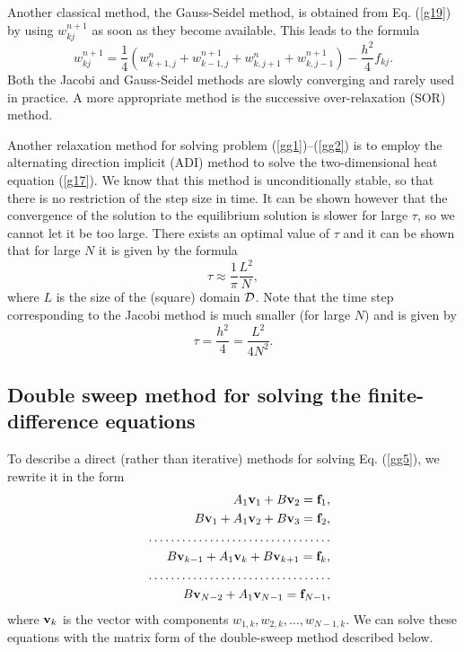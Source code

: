 Another classical method, the Gauss-Seidel method, is obtained from Eq. (\ref{g19})
by using $w_{kj}^{n+1}$ as soon as they become available. This leads to the formula
\begin{equation}
w_{kj}^{n+1}=\frac{1}{4}\left(w^{n}_{k+1,j}+w^{n+1}_{k-1,j}+w^{n}_{k,j+1}+w^{n+1}_{k,j-1}\right)
-\frac{h^2}{4}f_{kj}. \label{g20}
\end{equation}
Both the Jacobi and Gauss-Seidel methods are slowly converging and rarely used in practice.
A more appropriate method is the successive over-relaxation (SOR) method.

Another relaxation method for solving problem (\ref{gg1})--(\ref{gg2}) is to employ the alternating direction
implicit (ADI) method to solve the two-dimensional heat equation (\ref{g17}).
We know that this method is unconditionally stable, so that
there is no restriction of the step size in time. It can be shown however that the convergence of the
solution to the equilibrium solution is slower for large $\tau$, so we cannot let it be too large.
There exists an optimal value of $\tau$ and it can be shown that for large $N$ it is given by the formula
\[
\tau\approx\frac{1}{\pi}\frac{L^2}{N},
\]
where $L$ is the size of the (square) domain ${\cal D}$. Note that the time step corresponding
to the Jacobi method is much smaller (for large $N$) and is given by
\[
\tau=\frac{h^2}{4}=\frac{L^2}{4N^2}.
\]


\subsection{Double sweep method for solving the finite-difference equations}
To describe a direct (rather than iterative) methods for solving Eq. (\ref{gg5}), we rewrite
it in the form
\begin{eqnarray}
&&A_{1}{\bf v}_{1}+B{\bf v}_{2}={\bf f}_{1}, \nonumber \\
&&B{\bf v}_{1}+A_{1}{\bf v}_{2}+B{\bf v}_{3}={\bf f}_{2}, \nonumber \\
&& \dots \dots \dots \dots \dots \dots \dots \dots \dots \dots \dots \nonumber \\
&&B{\bf v}_{k-1}+A_{1}{\bf v}_{k}+B{\bf v}_{k+1}={\bf f}_{k}, \nonumber \\
&& \dots \dots \dots \dots \dots \dots \dots \dots \dots \dots \dots \nonumber \\
&&B{\bf v}_{N-2}+A_{1}{\bf v}_{N-1}={\bf f}_{{N-1}}, \label{g21}
\end{eqnarray}
where ${\bf v}_{k}$ is the vector with components $w_{1,k},
w_{2,k}, \dots, w_{N-1,k}$.
We can solve these equations with
the matrix form of the double-sweep method described below.


